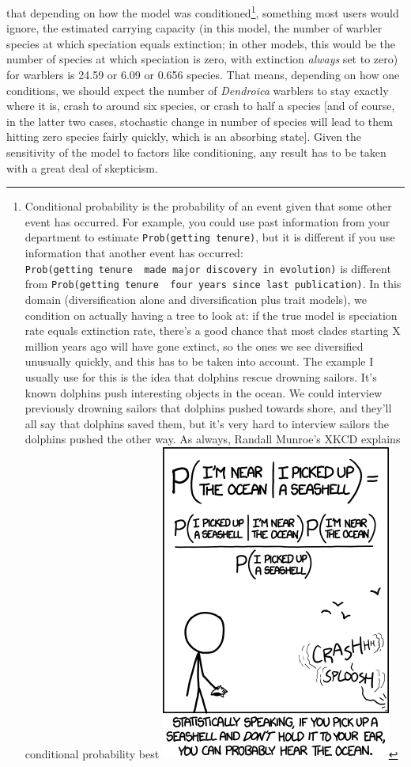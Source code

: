 \documentclass[]{article}
\let\rmarkdownfootnote\footnote%
\def\footnote{\protect\rmarkdownfootnote}
\theoremstyle{definition}
\theoremstyle{definition}
\theoremstyle{definition}
\theoremstyle{remark}
\begin{document}
that depending on how the model was conditioned\footnote{Conditional
  probability is the probability of an event given that some other event
  has occurred. For example, you could use past information from your
  department to estimate \texttt{Prob(getting\ tenure)}, but it is
  different if you use information that another event has occurred:
  \texttt{Prob(getting\ tenure\ \textbar{}\ made\ major\ discovery\ in\ evolution)}
  is different from
  \texttt{Prob(getting\ tenure\ \textbar{}\ four\ years\ since\ last\ publication)}.
  In this domain (diversification alone and diversification plus trait
  models), we condition on actually having a tree to look at: if the
  true model is speciation rate equals extinction rate, there's a good
  chance that most clades starting X million years ago will have gone
  extinct, so the ones we see diversified unusually quickly, and this
  has to be taken into account. The example I usually use for this is
  the idea that dolphins rescue drowning sailors. It's known dolphins
  push interesting objects in the ocean. We could interview previously
  drowning sailors that dolphins pushed towards shore, and they'll all
  say that dolphins saved them, but it's very hard to interview sailors
  the dolphins pushed the other way. As always, Randall Munroe's XKCD
  explains conditional probability best
  \includegraphics{images/seashell.png}}, something most users would
ignore, the estimated carrying capacity (in this model, the number of
warbler species at which speciation equals extinction; in other models,
this would be the number of species at which speciation is zero, with
extinction \emph{always} set to zero) for warblers is 24.59 or 6.09 or
0.656 species. That means, depending on how one conditions, we should
expect the number of \emph{Dendroica} warblers to stay exactly where it
is, crash to around six species, or crash to half a species {[}and of
course, in the latter two cases, stochastic change in number of species
will lead to them hitting zero species fairly quickly, which is an
absorbing state{]}. Given the sensitivity of the model to factors like
conditioning, any result has to be taken with a great deal of
skepticism.
\end{document}
